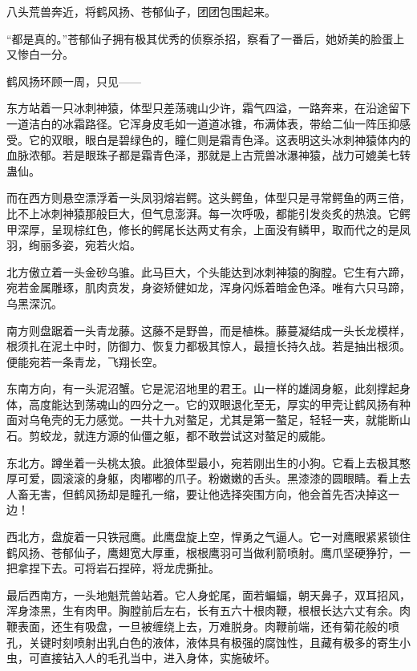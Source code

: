 
\begin{this_body}



八头荒兽奔近，将鹤风扬、苍郁仙子，团团包围起来。

“都是真的。”苍郁仙子拥有极其优秀的侦察杀招，察看了一番后，她娇美的脸蛋上又惨白一分。

鹤风扬环顾一周，只见——

东方站着一只冰刺神猿，体型只差荡魂山少许，霜气四溢，一路奔来，在沿途留下一道洁白的冰霜路径。它浑身皮毛如一道道冰锥，布满体表，带给二仙一阵压抑感受。它的双眼，眼白是碧绿色的，瞳仁则是霜青色泽。这表明这头冰刺神猿体内的血脉浓郁。若是眼珠子都是霜青色泽，那就是上古荒兽冰瀑神猿，战力可媲美七转蛊仙。

而在西方则悬空漂浮着一头凤羽熔岩鳄。这头鳄鱼，体型只是寻常鳄鱼的两三倍，比不上冰刺神猿那般巨大，但气息澎湃。每一次呼吸，都能引发炎炙的热浪。它鳄甲深厚，呈现棕红色，修长的鳄尾长达两丈有余，上面没有鳞甲，取而代之的是凤羽，绚丽多姿，宛若火焰。

北方傲立着一头金砂乌骓。此马巨大，个头能达到冰刺神猿的胸膛。它生有六蹄，宛若金属雕琢，肌肉贲发，身姿矫健如龙，浑身闪烁着暗金色泽。唯有六只马蹄，乌黑深沉。

南方则盘踞着一头青龙藤。这藤不是野兽，而是植株。藤蔓凝结成一头长龙模样，根须扎在泥土中时，防御力、恢复力都极其惊人，最擅长持久战。若是抽出根须。便能宛若一条青龙，飞翔长空。

东南方向，有一头泥沼蟹。它是泥沼地里的君王。山一样的雄阔身躯，此刻撑起身体，高度能达到荡魂山的四分之一。它的双眼退化至无，厚实的甲壳让鹤风扬有种面对乌龟壳的无力感觉。一共十九对螯足，尤其是第一螯足，轻轻一夹，就能断山石。剪蛟龙，就连方源的仙僵之躯，都不敢尝试这对螯足的威能。

东北方。蹲坐着一头桃太狼。此狼体型最小，宛若刚出生的小狗。它看上去极其憨厚可爱，圆滚滚的身躯，肉嘟嘟的爪子。粉嫩嫩的舌头。黑漆漆的圆眼睛。看上去人畜无害，但鹤风扬却是瞳孔一缩，要让他选择突围方向，他会首先否决掉这一边！

西北方，盘旋着一只铁冠鹰。此鹰盘旋上空，悍勇之气逼人。它一对鹰眼紧紧锁住鹤风扬、苍郁仙子，鹰翅宽大厚重，根根鹰羽可当做利箭喷射。鹰爪坚硬狰狞，一把拿捏下去。可将岩石捏碎，将龙虎撕扯。

最后西南方，一头地魁荒兽站着。它人身蛇尾，面若蝙蝠，朝天鼻子，双耳招风，浑身漆黑，生有肉甲。胸膛前后左右，长有五六十根肉鞭，根根长达六丈有余。肉鞭表面，还生有吸盘，一旦被缠绕上去，万难脱身。肉鞭前端，还有菊花般的喷孔，关键时刻喷射出乳白色的液体，液体具有极强的腐蚀性，且藏有极多的寄生小虫，可直接钻入人的毛孔当中，进入身体，实施破坏。


\end{this_body}
